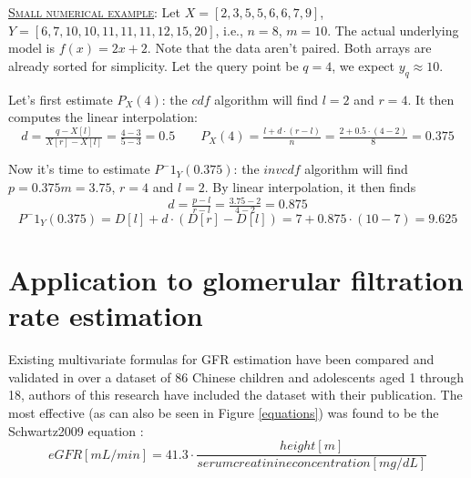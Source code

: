 \documentclass[10pt,final]{siamltex}
\begin{document}
\begin{tcolorbox}[colback=gray!30,%
  colframe=black,%
  width=\dimexpr\linewidth-2\fboxrule\relax,
  arc=3mm, auto outer arc,
  breakable
  ]
  \underline{\textsc{Small numerical example}}: Let $X=[2,3,5,5,6,6,7,9]$, $Y=[6,7,10,10,11,11,11,12,15,20]$, i.e., $n=8$, $m=10$. The actual underlying model is $f(x)=2x+2$. Note that the data aren't paired. Both arrays are already sorted for simplicity. Let the query point be $q=4$, we expect $y_q\approx10$.

Let's first estimate $P_X(4)$: the $cdf$ algorithm will find $l=2$ and $r=4$. It then computes the linear interpolation:
  \begin{equation*}
    d = \tfrac{q-X[l]}{X[r]-X[l]} = \tfrac{4-3}{5-3} = 0.5
    \quad\quad
    P_X(4)=\tfrac{l+d\cdot(r-l)}{n}=\tfrac{2+0.5\cdot(4-2)}{8}=0.375
  \end{equation*}

Now it's time to estimate $P^-1_Y(0.375)$: the $invcdf$ algorithm will find $p = 0.375  m=3.75$, $r=4$ and $l=2$. By linear interpolation, it then finds
    \begin{equation*}
      d = \tfrac{p-l}{r-l} = \tfrac{3.75-2}{4-2} = 0.875
    \end{equation*}
    \begin{equation*}
      P^-1_Y(0.375)=D[l]+d\cdot(D[r]-D[l])=7+0.875\cdot(10-7)=9.625
    \end{equation*}
\end{tcolorbox}
%
\section{Application to glomerular filtration rate estimation}\label{gfr}

Existing multivariate formulas for GFR estimation have been compared and validated  in \cite{gfr} over a dataset of 86 Chinese children and adolescents aged 1 through 18, authors of this research have included the dataset with their publication. The most effective (as can also be seen in Figure \ref{equations}) was found to be the Schwartz2009 equation \cite{schwartz}:
$$ eGFR[mL/min] = 41.3 \cdot \frac{height [m]}{serum creatinine concentration[mg/dL]}$$
\end{document}
